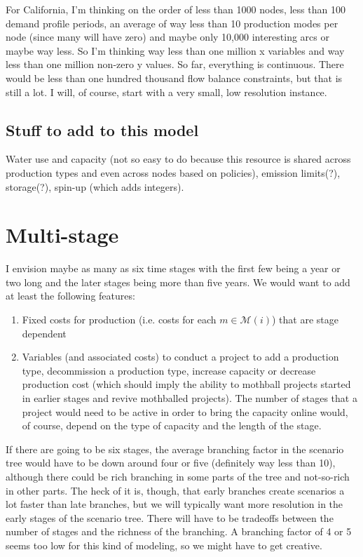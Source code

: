 \documentclass[11pt]{article}
\begin{document}
For California, I'm thinking on the order of less than 1000 nodes, less than 100 demand profile periods, an average of way less than 10 production modes per node (since many will have zero) and maybe only 10,000 interesting arcs or maybe way less. So I'm thinking way less than one million x variables and way less than one million non-zero y values. So far, everything is continuous. There would be less than one hundred thousand flow balance constraints, but that is still a lot. I will, of course, start with a very small, low resolution instance.

\subsection{Stuff to add to this model}

Water use and capacity (not so easy to do because this resource is shared across production types and even across nodes based on policies), 
emission limits(?), storage(?), spin-up (which adds integers).

\section{Multi-stage}

I envision maybe as many as six time stages with the first few being a year or two long and the later stages being more than five years. We would want to add at least the following features:
\begin{enumerate}
\item Fixed costs for production (i.e. costs for each $m \in \mathcal{M}(i)$) that are stage dependent
\item Variables (and associated costs) to conduct a project to add a production type, decommission a production type, increase capacity or decrease production cost (which should imply the ability to mothball projects started in earlier stages and revive mothballed projects). The number of stages that a project would need to be active in order to bring the capacity online would, of course, depend on the type of capacity and the length of the stage. 
\end{enumerate}

If there are going to be six stages, the average branching factor in the scenario tree would have to be down around four or five (definitely way less than 10), although there could be rich branching in some parts of the tree and not-so-rich in other parts. The heck of it is, though, that early branches create scenarios a lot faster than late branches, but we will typically want more resolution in the early stages of the scenario tree. There will have to be tradeoffs between the number of stages and the richness of the branching. A branching factor of 4 or 5 seems too low for this kind of modeling, so we might have to get creative.
\end{document}
